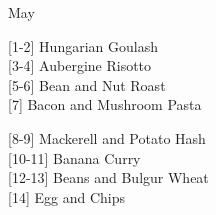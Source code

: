 		\begin{menu}{May}
    
    \begin{recipelist}
    
        {\scriptsize[1-2]} Hungarian Goulash\\
        {\scriptsize[3-4]} Aubergine Risotto\\
        {\scriptsize[5-6]} Bean and Nut Roast\\
        {\scriptsize[7]} Bacon and Mushroom Pasta\\%
    \end{recipelist}%
    \begin{recipelist}
    
        {\scriptsize[8-9]} Mackerell and Potato Hash\\
        {\scriptsize[10-11]} Banana Curry\\
        {\scriptsize[12-13]} Beans and Bulgur Wheat\\
        {\scriptsize[14]} Egg and Chips\\%
    \end{recipelist}\par%
  

\end{menu}
